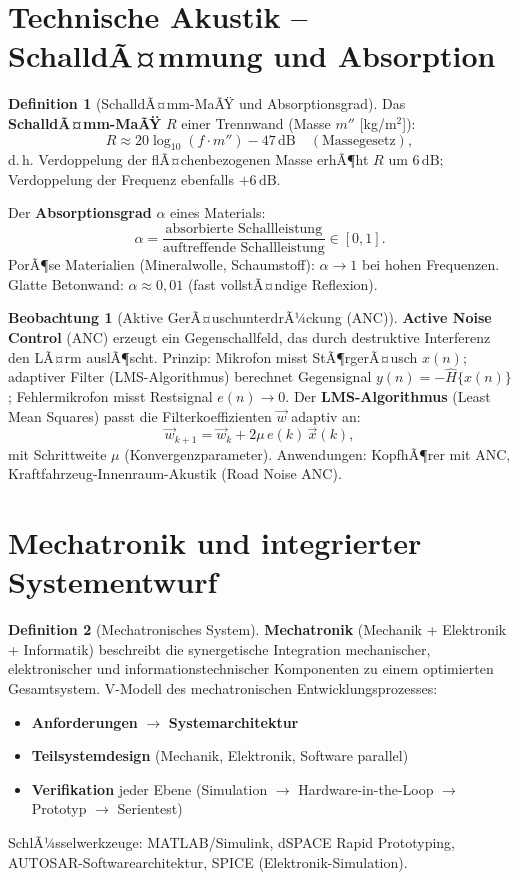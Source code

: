 ﻿\documentclass[a4paper,12pt]{report}
\theoremstyle{definition}
\newtheorem{definition}{Definition}
\newtheorem{beobachtung}{Beobachtung}
\begin{document}
\section{Technische Akustik -- SchalldÃ¤mmung und Absorption}

\begin{definition}[SchalldÃ¤mm-MaÃŸ und Absorptionsgrad]
Das \textbf{SchalldÃ¤mm-MaÃŸ} $R$ einer Trennwand (Masse $m''$ [kg/m$^2$]):
\[
  R \approx 20\log_{10}(f\cdot m'') - 47\,\mathrm{dB} \quad (\text{Massegesetz}),
\]
d.\,h. Verdoppelung der flÃ¤chenbezogenen Masse erhÃ¶ht $R$ um $6\,\mathrm{dB}$;
Verdoppelung der Frequenz ebenfalls $+6\,\mathrm{dB}$.

Der \textbf{Absorptionsgrad} $\alpha$ eines Materials:
\[
  \alpha = \frac{\text{absorbierte Schallleistung}}{\text{auftreffende Schallleistung}} \in [0,1].
\]
PorÃ¶se Materialien (Mineralwolle, Schaumstoff): $\alpha \to 1$ bei hohen Frequenzen.
Glatte Betonwand: $\alpha \approx 0{,}01$ (fast vollstÃ¤ndige Reflexion).
\end{definition}

\begin{beobachtung}[Aktive GerÃ¤uschunterdrÃ¼ckung (ANC)]
\textbf{Active Noise Control} (ANC) erzeugt ein Gegenschallfeld,
das durch destruktive Interferenz den LÃ¤rm auslÃ¶scht.
Prinzip: Mikrofon misst StÃ¶rgerÃ¤usch $x(n)$; adaptiver Filter
(LMS-Algorithmus) berechnet Gegensignal $y(n) = -\hat{H}\{x(n)\}$;
Fehlermikrofon misst Restsignal $e(n) \to 0$.
Der \textbf{LMS-Algorithmus} (Least Mean Squares) passt die Filterkoeffizienten
$\vec{w}$ adaptiv an:
\[
  \vec{w}_{k+1} = \vec{w}_k + 2\mu\,e(k)\,\vec{x}(k),
\]
mit Schrittweite $\mu$ (Konvergenzparameter).
Anwendungen: KopfhÃ¶rer mit ANC, Kraftfahrzeug-Innenraum-Akustik (Road Noise ANC).
\end{beobachtung}

\section{Mechatronik und integrierter Systementwurf}

\begin{definition}[Mechatronisches System]
\textbf{Mechatronik} (Mechanik + Elektronik + Informatik) beschreibt
die synergetische Integration mechanischer, elektronischer und
informationstechnischer Komponenten zu einem optimierten Gesamtsystem.
V-Modell des mechatronischen Entwicklungsprozesses:
\begin{itemize}
    \item[-] \textbf{Anforderungen} $\to$ \textbf{Systemarchitektur}
    \item[-] \textbf{Teilsystemdesign} (Mechanik, Elektronik, Software parallel)
    \item[-] \textbf{Verifikation} jeder Ebene (Simulation $\to$ Hardware-in-the-Loop $\to$ Prototyp $\to$ Serientest)
\end{itemize}
SchlÃ¼sselwerkzeuge: MATLAB/Simulink, dSPACE Rapid Prototyping,
AUTOSAR-Softwarearchitektur, SPICE (Elektronik-Simulation).
\end{definition}
\end{document}
